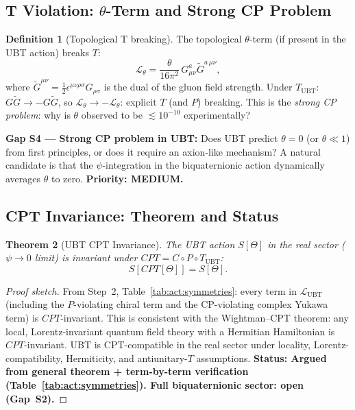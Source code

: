 \documentclass[12pt,a4paper]{article}
\newtheorem{theorem}{Theorem}[section]
\theoremstyle{definition}
\newtheorem{definition}[theorem]{Definition}
\theoremstyle{remark}
\begin{document}
\subsection{T Violation: $\theta$-Term and Strong CP Problem}
\label{subsec:cat:T}

\begin{definition}[Topological T breaking]
\label{def:cat:T_breaking}
The topological $\theta$-term (if present in the UBT action) breaks $T$:
\begin{equation}
  \mathcal{L}_\theta = \frac{\theta}{16\pi^2}\, G^a_{\mu\nu}\tilde{G}^{a\,\mu\nu},
  \label{eq:cat:L_theta}
\end{equation}
where $\tilde{G}^{\mu\nu} = \tfrac{1}{2}\epsilon^{\mu\nu\rho\sigma}G_{\rho\sigma}$
is the dual of the gluon field strength.
Under $T_{\mathrm{UBT}}$: $G\tilde{G} \to -G\tilde{G}$, so
$\mathcal{L}_\theta \to -\mathcal{L}_\theta$: explicit $T$ (and $P$) breaking.
This is the \emph{strong CP problem}: why is $\theta$ observed to be
$\lesssim 10^{-10}$ experimentally?
\end{definition}

\begin{gapbox}
\textbf{Gap S4 --- Strong CP problem in UBT:}
Does UBT predict $\theta = 0$ (or $\theta \ll 1$) from first principles, or
does it require an axion-like mechanism?
A natural candidate is that the $\psi$-integration in the biquaternionic
action dynamically averages $\theta$ to zero.
\textbf{Priority: MEDIUM.}
\end{gapbox}

\subsection{CPT Invariance: Theorem and Status}
\label{subsec:cat:CPT}

\begin{theorem}[UBT CPT Invariance]
\label{thm:cat:CPT}
The UBT action $S[\Theta]$ in the real sector ($\psi \to 0$ limit) is invariant
under $CPT = C \circ P \circ T_{\mathrm{UBT}}$:
\begin{equation}
  S[CPT[\Theta]] = S[\Theta].
\end{equation}
\end{theorem}

\begin{proof}[Proof sketch]
From Step~2, Table~\ref{tab:act:symmetries}: every term in
$\mathcal{L}_{\mathrm{UBT}}$ (including the $P$-violating chiral term and the
CP-violating complex Yukawa term) is $CPT$-invariant.
This is consistent with the Wightman--CPT theorem: any local, Lorentz-invariant
quantum field theory with a Hermitian Hamiltonian is $CPT$-invariant.
UBT is CPT-compatible in the real sector under locality,
Lorentz-compatibility, Hermiticity, and antiunitary-$T$ assumptions.
\textbf{Status: Argued from general theorem + term-by-term verification
(Table~\ref{tab:act:symmetries}). Full biquaternionic sector: open (Gap~S2).}
\end{proof}
\end{document}
